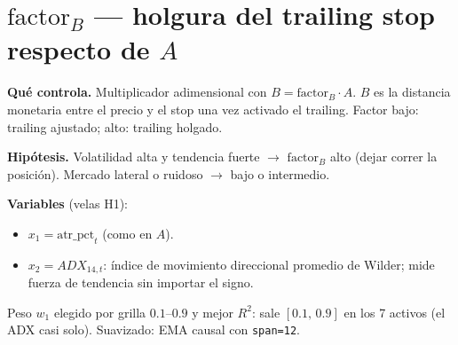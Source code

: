 \documentclass[11pt,a4paper]{article}
\newcommand{\code}[1]{\texttt{\small #1}}
\begin{document}
\section*{$\text{factor}_B$ --- holgura del trailing stop respecto de $A$}

\textbf{Qué controla.} Multiplicador adimensional con $B=\text{factor}_B\cdot A$. $B$ es la distancia monetaria entre el precio y el stop una vez activado el trailing. Factor bajo: trailing ajustado; alto: trailing holgado.

\textbf{Hipótesis.} Volatilidad alta y tendencia fuerte $\rightarrow$ $\text{factor}_B$ alto (dejar correr la posición). Mercado lateral o ruidoso $\rightarrow$ bajo o intermedio.

\textbf{Variables} (velas H1):
\begin{itemize}\setlength{\itemsep}{1pt}\setlength{\topsep}{1pt}
\item $x_1=\text{atr\_pct}_t$ (como en $A$).
\item $x_2=ADX_{14,t}$: índice de movimiento direccional promedio de Wilder; mide fuerza de tendencia sin importar el signo.
\end{itemize}
Peso $w_1$ elegido por grilla $0.1$--$0.9$ y mejor $R^2$: sale $[0.1,\,0.9]$ en los 7 activos (el ADX casi solo). Suavizado: EMA causal con \code{span=12}.
\end{document}

